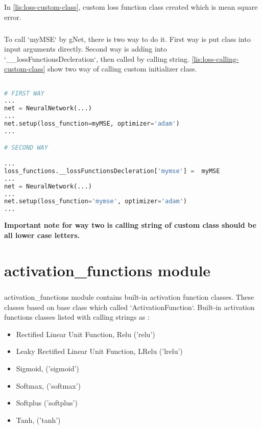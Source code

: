 \documentclass[12pt]{report}
\begin{document}
In \ref{lis:loss-custom-class}, custom loss function class created which is mean square error. 

\paragraph{}
To call `myMSE` by gNet, there is two way to do it. First way is put class into input arguments directly. Second way is adding into  `\_\_lossFunctionsDecleration`, then called by calling string. \ref{lis:loss-calling-custom-class} show two way of calling custom initializer class.

\begin{lstlisting}[language=Python, numbers=none, caption={Calling custom loss function class.}, label={lis:loss-calling-custom-class}]

# FIRST WAY
...
net = NeuralNetwork(...)
...
net.setup(loss_function=myMSE, optimizer='adam')
...

# SECOND WAY

...
loss_functions.__lossFunctionsDecleration['mymse'] =  myMSE
...
net = NeuralNetwork(...)
...
net.setup(loss_function='mymse', optimizer='adam')
...

\end{lstlisting}

\textbf{Important note for way two is calling string of custom class should be all lower case letters. }




\chapter{activation\_functions module}

\paragraph{}
activation\_functions module contains built-in activation function classes. These classes based on base class which called `ActivationFunction`. Built-in activation functions classes listed with calling strings as : 

\begin{itemize}
	\item	Rectified Linear Unit Function, Relu ('relu')
	\item	Leaky Rectified Linear Unit Function, LRelu ('lrelu')
	\item	Sigmoid, ('sigmoid')
	\item	Softmax, ('softmax')
	\item	Softplus ('softplus')
	\item	Tanh, ('tanh')
\end{itemize}
\end{document}
